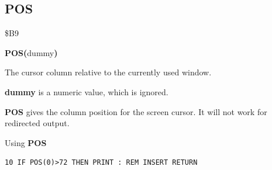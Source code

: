 
\newpage
\subsection{POS}
\begin{description}[leftmargin=2cm,style=nextline]
\item [Token:]    \$B9

\item [Format:]   {\bf POS(}dummy{\bf)}

\item [Returns:]  The cursor column relative to the currently used window.

                  {\bf dummy} is a numeric value, which is ignored.

\item [Remarks:]  {\bf POS} gives the column position for the screen cursor. It will not work for redirected output.

\item [Example:]  Using {\bf POS}

\begin{tcolorbox}[colback=black,coltext=white]
\verbatimfont{\codefont}
\begin{verbatim}
10 IF POS(0)>72 THEN PRINT : REM INSERT RETURN
\end{verbatim}
\end{tcolorbox}
\end{description}


\newpage
